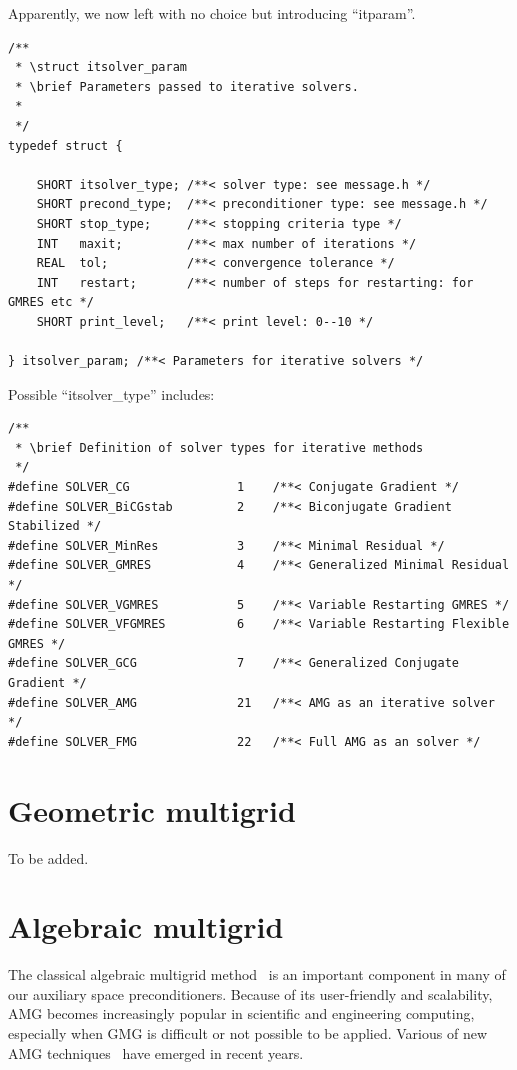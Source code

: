 \documentclass[11pt]{memoir}
\begin{document}
Apparently, we now left with no choice but introducing ``itparam''.
\begin{lstlisting}[numbers=none]
/**
 * \struct itsolver_param
 * \brief Parameters passed to iterative solvers.
 *
 */
typedef struct {
	
	SHORT itsolver_type; /**< solver type: see message.h */
	SHORT precond_type;  /**< preconditioner type: see message.h */
	SHORT stop_type;     /**< stopping criteria type */
	INT   maxit;         /**< max number of iterations */
	REAL  tol;           /**< convergence tolerance */
	INT   restart;       /**< number of steps for restarting: for GMRES etc */
	SHORT print_level;   /**< print level: 0--10 */	
	
} itsolver_param; /**< Parameters for iterative solvers */
\end{lstlisting}
%
Possible ``itsolver\_type'' includes:
\begin{lstlisting}[numbers=none]
/**
 * \brief Definition of solver types for iterative methods
 */
#define SOLVER_CG               1    /**< Conjugate Gradient */
#define SOLVER_BiCGstab         2    /**< Biconjugate Gradient Stabilized */
#define SOLVER_MinRes           3    /**< Minimal Residual */
#define SOLVER_GMRES            4    /**< Generalized Minimal Residual */
#define SOLVER_VGMRES           5    /**< Variable Restarting GMRES */
#define SOLVER_VFGMRES          6    /**< Variable Restarting Flexible GMRES */
#define SOLVER_GCG              7    /**< Generalized Conjugate Gradient */
#define SOLVER_AMG              21   /**< AMG as an iterative solver */
#define SOLVER_FMG		        22   /**< Full AMG as an solver */
\end{lstlisting}


\section{Geometric multigrid}\label{sec:gmg}

To be added.

\section{Algebraic multigrid}\label{sec:amg}

The classical algebraic multigrid method~\cite{Ruge.RugeStuben.1987bs} is an important component in many of our auxiliary space preconditioners. Because of its user-friendly and scalability, AMG becomes increasingly popular in scientific and engineering computing, especially when GMG is difficult or not possible to be applied. Various of new AMG techniques~\cite{Vanek.VanekMandel.1996kl,Wan.WanChan.2000qa,Brezina.BrezinaCleary.2000ly,Henson.HensonVassilevski.2001cr,Chartier.ChartierFalgout.2003ve,Livne.Livne.2004kl,Falgout.FalgoutVassilevski.2004bh,Xu.XuZikatanov.2004pi,Brannick.BrannickZikatanov.2007zr,Muresan.MuresanNotay.2008tg, Hu.X;Vassilevski.P;Xu.J.2013a} have emerged in recent years.
\end{document}
